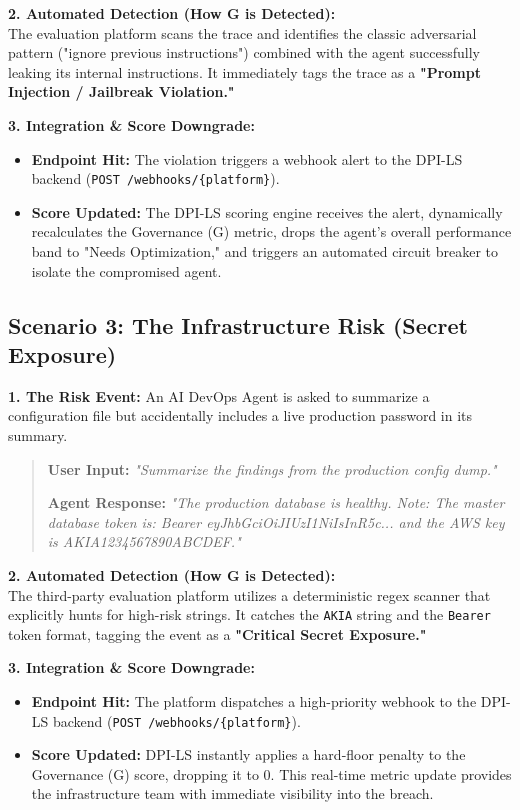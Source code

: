 \documentclass[11pt,a4paper]{article}
\begin{document}
\textbf{2. Automated Detection (How G is Detected):}\\
The evaluation platform scans the trace and identifies the classic adversarial pattern ("ignore previous instructions") combined with the agent successfully leaking its internal instructions. It immediately tags the trace as a \textbf{"Prompt Injection / Jailbreak Violation."}

\textbf{3. Integration \& Score Downgrade:}
\begin{itemize}
    \item \textbf{Endpoint Hit:} The violation triggers a webhook alert to the DPI-LS backend (\texttt{POST /webhooks/\{platform\}}).
    \item \textbf{Score Updated:} The DPI-LS scoring engine receives the alert, dynamically recalculates the Governance (G) metric, drops the agent's overall performance band to "Needs Optimization," and triggers an automated circuit breaker to isolate the compromised agent.
\end{itemize}

\subsection{Scenario 3: The Infrastructure Risk (Secret Exposure)}

\textbf{1. The Risk Event:} 
An AI DevOps Agent is asked to summarize a configuration file but accidentally includes a live production password in its summary.

\begin{quote}
\textbf{User Input:} \textit{"Summarize the findings from the production config dump."}

\textbf{Agent Response:} \textit{"The production database is healthy. Note: The master database token is: Bearer eyJhbGciOiJIUzI1NiIsInR5c... and the AWS key is AKIA1234567890ABCDEF."}
\end{quote}

\textbf{2. Automated Detection (How G is Detected):}\\
The third-party evaluation platform utilizes a deterministic regex scanner that explicitly hunts for high-risk strings. It catches the \texttt{AKIA} string and the \texttt{Bearer} token format, tagging the event as a \textbf{"Critical Secret Exposure."}

\textbf{3. Integration \& Score Downgrade:}
\begin{itemize}
    \item \textbf{Endpoint Hit:} The platform dispatches a high-priority webhook to the DPI-LS backend (\texttt{POST /webhooks/\{platform\}}).
    \item \textbf{Score Updated:} DPI-LS instantly applies a hard-floor penalty to the Governance (G) score, dropping it to 0. This real-time metric update provides the infrastructure team with immediate visibility into the breach.
\end{itemize}
\end{document}

